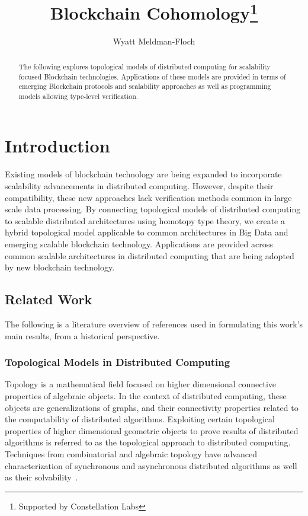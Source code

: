 \documentclass[runningheads]{llncs}
\begin{document}
%
\title{Blockchain Cohomology\thanks{Supported by Constellation Labs}}
%
%
\author{Wyatt Meldman-Floch }
%
%
%
\maketitle              %
%
\begin{abstract}
The following explores topological models of distributed computing for scalability focused Blockchain technologies. Applications of these models are provided in terms of emerging Blockchain protocols and scalability approaches as well as programming models allowing type-level verification.
\end{abstract}
%
%
%
\section{Introduction} 
Existing models of blockchain technology are being expanded to incorporate scalability advancements in distributed computing. However, despite their compatibility, these new approaches lack verification methods common in large scale data processing. By connecting topological models of distributed computing to scalable distributed architectures using homotopy type theory, we create a hybrid topological model applicable to common architectures in Big Data and emerging scalable blockchain technology. Applications are provided across common scalable architectures in distributed computing that are being adopted by new blockchain technology.

\subsection{Related Work}
The following is a literature overview of references used in formulating this work's main results, from a historical perspective. 

\subsubsection{Topological Models in Distributed Computing}
Topology is a mathematical field focused on higher dimensional connective properties of algebraic objects. In the context of distributed computing, these objects are generalizations of graphs, and their connectivity properties related to the computability of distributed algorithms. Exploiting certain topological properties of higher dimensional geometric objects to prove results of distributed algorithms is referred to as the topological approach to distributed computing. Techniques from combinatorial and algebraic topology have advanced characterization of synchronous and asynchronous distributed algorithms as well as their solvability~\cite{ref_article1,ref_article2,ref_article3,ref_article4}. 
\end{document}
